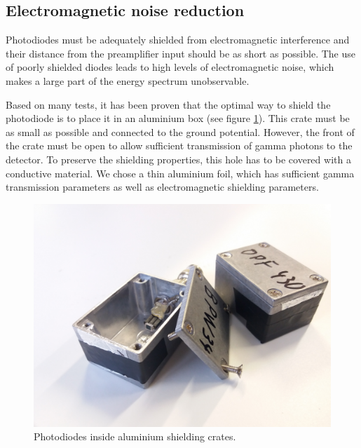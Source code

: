 \subsection{Electromagnetic noise reduction}
Photodiodes must be adequately shielded from electromagnetic interference and their distance from the preamplifier input should be as short as possible. The use of poorly shielded diodes leads to high levels of electromagnetic noise, which makes a large part of the energy spectrum unobservable.
\par
Based on many tests, it has been proven that the optimal way to shield the photodiode is to place it in an aluminium box (see figure \ref{crate}). This crate must be as small as possible and connected to the ground potential. However, the front of the crate must be open to allow sufficient transmission of gamma photons to the detector. To preserve the shielding properties, this hole has to be covered with a conductive material. We chose a thin aluminium foil, which has sufficient gamma transmission parameters as well as electromagnetic shielding parameters.

\begin{figure}[H]
 \centering
 \includegraphics[scale=0.09, angle = 0]{./pictures/ShieldCrate.jpg}
 \caption{Photodiodes inside aluminium shielding crates.}
 \label{crate}
 
\end{figure}



